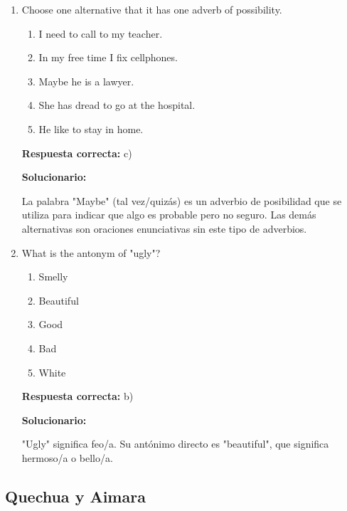 \begin{enumerate}[resume]
	\item Choose one alternative that it has one adverb of possibility.
	\begin{enumerate}[label=\alph*)]
		\item I need to call to my teacher.
		\item In my free time I fix cellphones.
		\item Maybe he is a lawyer.
		\item She has dread to go at the hospital.
		\item He like to stay in home.
	\end{enumerate}
	\textbf{Respuesta correcta:} c)

	\vspace{2mm}
	\textbf{Solucionario:}

	La palabra "Maybe" (tal vez/quizás) es un adverbio de posibilidad que se utiliza para indicar que algo es probable pero no seguro. Las demás alternativas son oraciones enunciativas sin este tipo de adverbios.

	\vspace{6mm}

	\item What is the antonym of "ugly"?
	\begin{enumerate}[label=\alph*)]
		\item Smelly
		\item Beautiful
		\item Good
		\item Bad
		\item White
	\end{enumerate}
	\textbf{Respuesta correcta:} b)

	\vspace{2mm}
	\textbf{Solucionario:}

	"Ugly" significa feo/a. Su antónimo directo es "beautiful", que significa hermoso/a o bello/a.

	\vspace{6mm}
\end{enumerate}

\subsection*{Quechua y Aimara}

